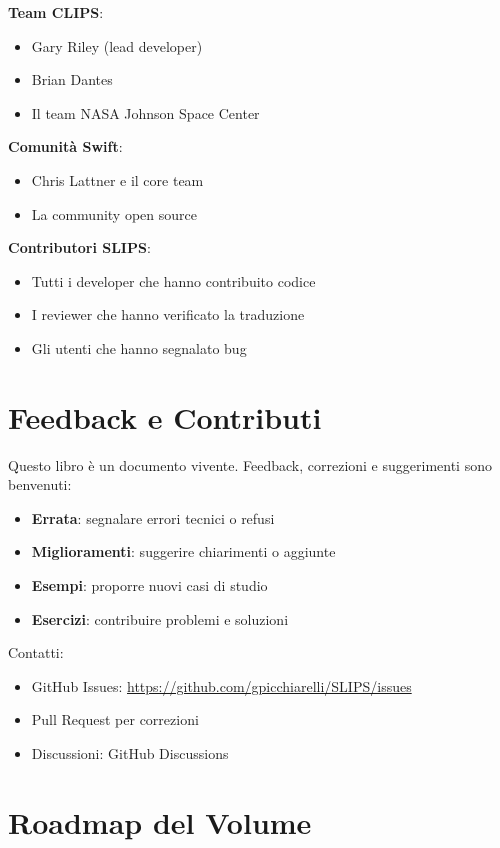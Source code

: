 \textbf{Team CLIPS}:
\begin{itemize}
\item Gary Riley (lead developer)
\item Brian Dantes
\item Il team NASA Johnson Space Center
\end{itemize}

\textbf{Comunità Swift}:
\begin{itemize}
\item Chris Lattner e il core team
\item La community open source
\end{itemize}

\textbf{Contributori SLIPS}:
\begin{itemize}
\item Tutti i developer che hanno contribuito codice
\item I reviewer che hanno verificato la traduzione
\item Gli utenti che hanno segnalato bug
\end{itemize}

\section{Feedback e Contributi}

Questo libro è un documento vivente. Feedback, correzioni e suggerimenti sono benvenuti:

\begin{itemize}
\item \textbf{Errata}: segnalare errori tecnici o refusi
\item \textbf{Miglioramenti}: suggerire chiarimenti o aggiunte
\item \textbf{Esempi}: proporre nuovi casi di studio
\item \textbf{Esercizi}: contribuire problemi e soluzioni
\end{itemize}

Contatti:
\begin{itemize}
\item GitHub Issues: \url{https://github.com/gpicchiarelli/SLIPS/issues}
\item Pull Request per correzioni
\item Discussioni: GitHub Discussions
\end{itemize}

\section{Roadmap del Volume}

